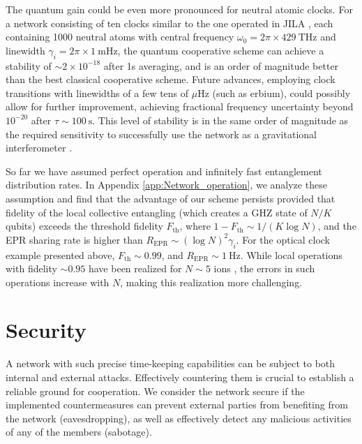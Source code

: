 The quantum gain could be even more pronounced for neutral atomic clocks. For a
network consisting of ten clocks similar to the one operated in JILA
\cite{Bloom2013}, each containing 1000 neutral atoms with central frequency
$\omega_0 = 2\pi\times 429~\mathrm{THz}$ and linewidth $\gamma_i = 2\pi \times
1~\mathrm{mHz}$,  the quantum cooperative scheme can achieve a stability of $\sim
2\times 10^{-18}$ after 1s averaging, and is an order of magnitude
better than the best classical cooperative scheme.  Future advances,
employing clock transitions with linewidths of a few tens of
$\mu\mathrm{Hz}$ (such as erbium), could possibly allow for further
improvement, achieving fractional frequency uncertainty beyond $10^{-20}$
after $\tau \sim 100~\mathrm{s}$. This level of stability is in the same order of
magnitude as the required sensitivity to successfully use the network as a
gravitational interferometer \cite{Schiller2008}.


So far we have assumed perfect operation and infinitely fast entanglement
distribution rates. In Appendix \ref{app:Network_operation}, we analyze these assumption
and find that the advantage of our scheme persists provided that fidelity  of the local collective
entangling \cite{MSgate} (which creates a GHZ state of $N/K$ qubits) exceeds the
threshold fidelity $F_\mathrm{th}$, where $1-F_\mathrm{th} \sim 1/(K\log N)$, and
the EPR sharing rate is higher than $R_\mathrm{EPR}\sim (\log N)^2 \gamma_i$.
For the optical clock example presented above, $F_\mathrm{th} \sim 0.99$, and
$R_\mathrm{EPR} \sim 1~\mathrm{Hz}$. While local operations with fidelity
$\sim 0.95$ have been realized for $N\sim 5$ ions \cite{Monz2011}, the errors
in such operations increase with $N$, making this realization more challenging.




\section{Security}
\label{sec:Security}
A network with such precise time-keeping capabilities can be subject to both internal
and external attacks. Effectively countering them is crucial to establish a
reliable ground for cooperation. We consider the network secure if the
implemented countermeasures can prevent external parties from benefiting from
the network (eavesdropping), as well as effectively detect any malicious activities of any of the members (sabotage).

